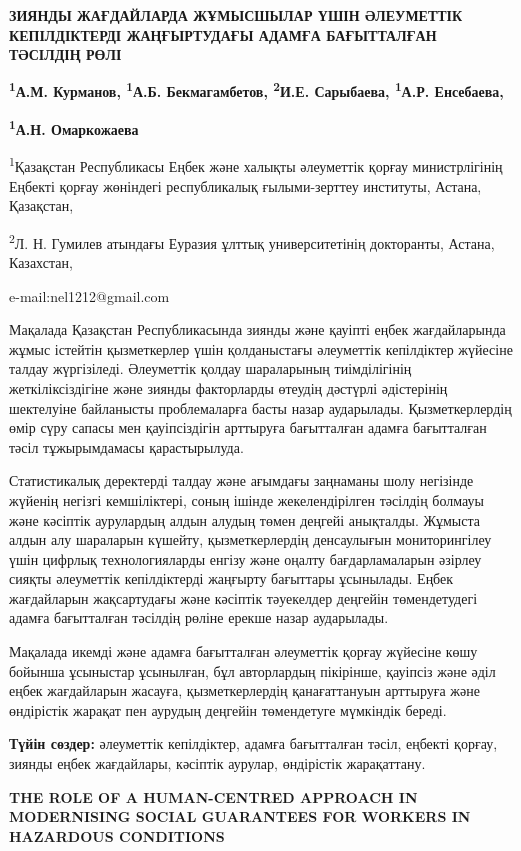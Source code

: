 {\bfseries ЗИЯНДЫ ЖАҒДАЙЛАРДА ЖҰМЫСШЫЛАР ҮШІН ӘЛЕУМЕТТІК КЕПІЛДІКТЕРДІ
ЖАҢҒЫРТУДАҒЫ АДАМҒА БАҒЫТТАЛҒАН ТӘСІЛДІҢ РӨЛІ}

{\bfseries \textsuperscript{1}А.М. Курманов, \textsuperscript{1}А.Б.
Бекмагамбетов, \textsuperscript{2}И.Е. Сарыбаева,
\textsuperscript{1}А.Р. Енсебаева\textsuperscript{\envelope },}

{\bfseries \textsuperscript{1}А.Н. Омаркожаева}

\textsuperscript{1}Қазақстан Республикасы Еңбек және халықты әлеуметтік
қорғау министрлігінің Еңбекті қорғау жөніндегі республикалық
ғылыми-зерттеу институты, Астана, Қазақстан,

\textsuperscript{2}Л. Н. Гумилев атындағы Еуразия ұлттық университетінің
докторанты, Астана, Казахстан,

e-mail:nel1212@gmail.com

Мақалада Қазақстан Республикасында зиянды және қауіпті еңбек
жағдайларында жұмыс істейтін қызметкерлер үшін қолданыстағы әлеуметтік
кепілдіктер жүйесіне талдау жүргізіледі. Әлеуметтік қолдау шараларының
тиімділігінің жеткіліксіздігіне және зиянды факторларды өтеудің дәстүрлі
әдістерінің шектелуіне байланысты проблемаларға басты назар аударылады.
Қызметкерлердің өмір сүру сапасы мен қауіпсіздігін арттыруға бағытталған
адамға бағытталған тәсіл тұжырымдамасы қарастырылуда.

Статистикалық деректерді талдау және ағымдағы заңнаманы шолу негізінде
жүйенің негізгі кемшіліктері, соның ішінде жекелендірілген тәсілдің
болмауы және кәсіптік аурулардың алдын алудың төмен деңгейі анықталды.
Жұмыста алдын алу шараларын күшейту, қызметкерлердің денсаулығын
мониторингілеу үшін цифрлық технологияларды енгізу және оңалту
бағдарламаларын әзірлеу сияқты әлеуметтік кепілдіктерді жаңғырту
бағыттары ұсынылады. Еңбек жағдайларын жақсартудағы және кәсіптік
тәуекелдер деңгейін төмендетудегі адамға бағытталған тәсілдің рөліне
ерекше назар аударылады.

Мақалада икемді және адамға бағытталған әлеуметтік қорғау жүйесіне көшу
бойынша ұсыныстар ұсынылған, бұл авторлардың пікірінше, қауіпсіз және
әділ еңбек жағдайларын жасауға, қызметкерлердің қанағаттануын арттыруға
және өндірістік жарақат пен аурудың деңгейін төмендетуге мүмкіндік
береді.

{\bfseries Түйін сөздер:} әлеуметтік кепілдіктер, адамға бағытталған тәсіл,
еңбекті қорғау, зиянды еңбек жағдайлары, кәсіптік аурулар, өндірістік
жарақаттану.

{\bfseries THE ROLE OF A HUMAN-CENTRED APPROACH IN MODERNISING SOCIAL
GUARANTEES FOR WORKERS IN HAZARDOUS CONDITIONS}

